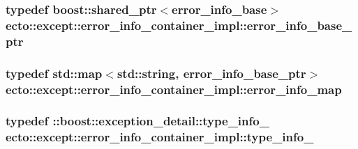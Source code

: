 \subsubsection[{\texorpdfstring{error\+\_\+info\+\_\+base\+\_\+ptr}{error_info_base_ptr}}]{\setlength{\rightskip}{0pt plus 5cm}typedef boost\+::shared\+\_\+ptr$<${\bf error\+\_\+info\+\_\+base}$>$ {\bf ecto\+::except\+::error\+\_\+info\+\_\+container\+\_\+impl\+::error\+\_\+info\+\_\+base\+\_\+ptr}\hspace{0.3cm}{\ttfamily [private]}}\hypertarget{classecto_1_1except_1_1error__info__container__impl_a9fbca0758380cb123f790aee77d1d4d8}{}\label{classecto_1_1except_1_1error__info__container__impl_a9fbca0758380cb123f790aee77d1d4d8}
\subsubsection[{\texorpdfstring{error\+\_\+info\+\_\+map}{error_info_map}}]{\setlength{\rightskip}{0pt plus 5cm}typedef std\+::map$<$std\+::string, {\bf error\+\_\+info\+\_\+base\+\_\+ptr}$>$ {\bf ecto\+::except\+::error\+\_\+info\+\_\+container\+\_\+impl\+::error\+\_\+info\+\_\+map}\hspace{0.3cm}{\ttfamily [private]}}\hypertarget{classecto_1_1except_1_1error__info__container__impl_a20b3846bc393224fe282eb64a40ee83d}{}\label{classecto_1_1except_1_1error__info__container__impl_a20b3846bc393224fe282eb64a40ee83d}
\subsubsection[{\texorpdfstring{type\+\_\+info\+\_\+}{type_info_}}]{\setlength{\rightskip}{0pt plus 5cm}typedef \+::boost\+::exception\+\_\+detail\+::type\+\_\+info\+\_\+ {\bf ecto\+::except\+::error\+\_\+info\+\_\+container\+\_\+impl\+::type\+\_\+info\+\_\+}\hspace{0.3cm}{\ttfamily [private]}}\hypertarget{classecto_1_1except_1_1error__info__container__impl_abe4f51bf533842a5e0b81f3e43ae6267}{}\label{classecto_1_1except_1_1error__info__container__impl_abe4f51bf533842a5e0b81f3e43ae6267}


